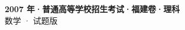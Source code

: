 \documentclass[zihao=-4, a4paper]{ctexart}
\begin{document}
\begin{center}
  {\Large\bfseries 2007 年·普通高等学校招生考试·福建卷·理科}\\[4pt]
  {\large 数学 · 试题版}
\end{center}
\medskip
{}

\end{document}
